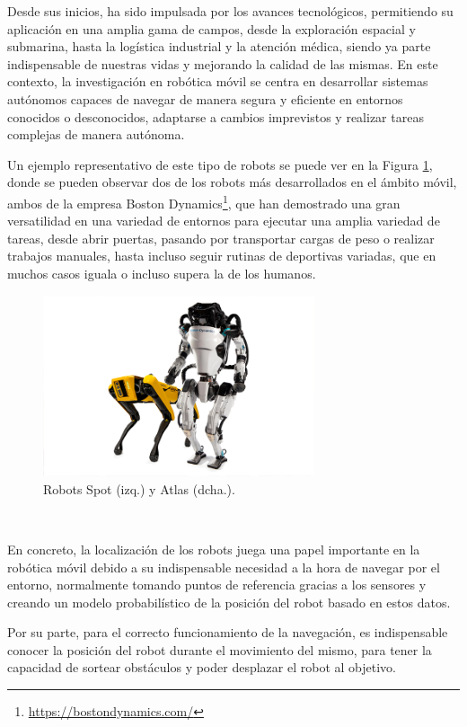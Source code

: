 Desde sus inicios, ha sido impulsada por los avances tecnológicos, permitiendo
su aplicación en una amplia gama de campos, desde la exploración espacial y
submarina, hasta la logística industrial y la atención médica, siendo ya parte
indispensable de nuestras vidas y mejorando la calidad de las mismas.
En este contexto, la investigación en robótica móvil se centra en desarrollar
sistemas autónomos capaces de navegar de manera segura y eficiente en entornos
conocidos o desconocidos, adaptarse a cambios imprevistos y realizar tareas
complejas de manera autónoma.

Un ejemplo representativo de este tipo de robots se puede ver en la Figura
\ref{fig:boston_dynamics}, donde se pueden observar dos de los robots más
desarrollados en el ámbito móvil, ambos de la empresa Boston
Dynamics\footnote{\url{https://bostondynamics.com/}}, que han demostrado una
gran versatilidad en una variedad de entornos para ejecutar una amplia variedad
de tareas, desde abrir puertas, pasando por transportar cargas de peso o
realizar trabajos manuales, hasta incluso seguir rutinas de deportivas variadas,
que en muchos casos iguala o incluso supera la de los humanos.

\begin{figure} [h!]
  \begin{center}
    \includegraphics[width=8cm]{figs/atlas_spot_boston_dynamics}
  \end{center}
  \caption{Robots Spot (izq.) y Atlas (dcha.).}
  \label{fig:boston_dynamics}
\end{figure}\

En concreto, la localización de los robots juega una papel importante en la
robótica móvil debido a su indispensable necesidad a la hora de navegar por el
entorno, normalmente tomando puntos de referencia gracias a los sensores y
creando un modelo probabilístico de la posición del robot basado en estos datos.

Por su parte, para el correcto funcionamiento de la navegación, es indispensable
conocer la posición del robot durante el movimiento del mismo, para tener la
capacidad de sortear obstáculos y poder desplazar el robot al objetivo.

